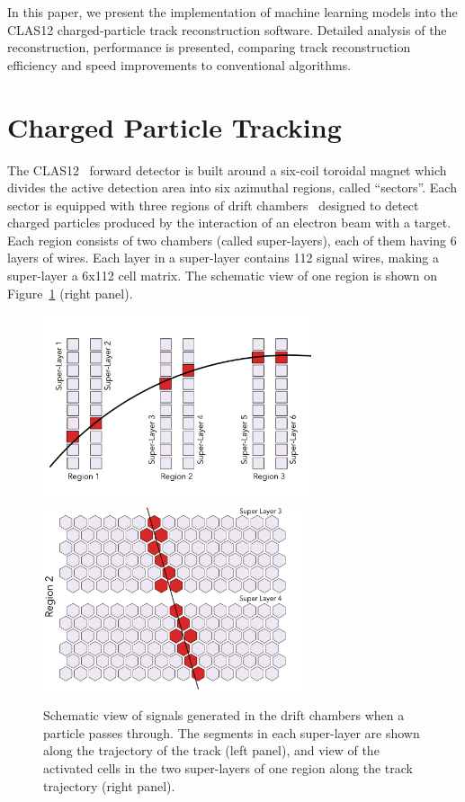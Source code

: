 \documentclass[aps,prl,preprint,12pt]{revtex4}
\begin{document}
In this paper, we present the implementation of machine learning models into the CLAS12 charged-particle track reconstruction software. Detailed analysis 
of the reconstruction, performance is presented, comparing track reconstruction efficiency and speed improvements to conventional algorithms.

\section{Charged Particle Tracking}

The CLAS12~\cite{Burkert:2020akg} forward detector is built around a six-coil toroidal magnet 
which divides the active detection area into six azimuthal regions, called ``sectors''. Each sector is 
equipped with three regions of drift chambers~\cite{Mestayer:2020saf} designed to detect charged 
particles produced by the interaction of an electron beam with a target. Each region consists of two 
chambers (called super-layers), each of them having 6 layers of wires. Each layer  in a super-layer 
contains 112 signal wires, making a super-layer a 6x112 cell matrix. The schematic view of one region 
is shown on Figure~\ref{dc:side_view} (right panel).

\begin{figure}[!ht]
\begin{center}
 \includegraphics[width=3.1in]{images/dc_diagram.pdf}
 \includegraphics[width=3in]{images/region_2_diagram.pdf}
\caption {Schematic view of signals generated in the drift chambers when a particle passes through. 
The segments in each super-layer are shown along the trajectory of the track (left panel), and view 
of the activated cells in the two super-layers of one region along the track trajectory (right panel).}
 \label{dc:side_view}
 \end{center}
\end{figure}
\end{document}
